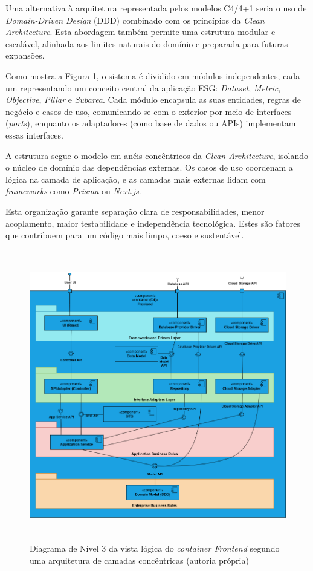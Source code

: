 Uma alternativa à arquitetura representada pelos modelos C4/4+1 seria o uso de \textit{Domain-Driven Design} (DDD) combinado com os princípios da \textit{Clean Architecture}. Esta abordagem também permite uma estrutura modular e escalável, alinhada aos limites naturais do domínio e preparada para futuras expansões.

Como mostra a Figura \ref{fig:alternativeModel}, o sistema é dividido em módulos independentes, cada um representando um conceito central da aplicação ESG: \textit{Dataset}, \textit{Metric}, \textit{Objective}, \textit{Pillar} e \textit{Subarea}. Cada módulo encapsula as suas entidades, regras de negócio e casos de uso, comunicando-se com o exterior por meio de interfaces (\textit{ports}), enquanto os adaptadores (como base de dados ou APIs) implementam essas interfaces.

A estrutura segue o modelo em anéis concêntricos da \textit{Clean Architecture}, isolando o núcleo de domínio das dependências externas. Os casos de uso coordenam a lógica na camada de aplicação, e as camadas mais externas lidam com \textit{frameworks} como \textit{Prisma} ou \textit{Next.js}.

Esta organização garante separação clara de responsabilidades, menor acoplamento, maior testabilidade e independência tecnológica. Estes são fatores que contribuem para um código mais limpo, coeso e sustentável.

\begin{figure}[H]
    \centering
    \includegraphics[height=5in,keepaspectratio]{frontmatter/assets/diagrams/AlternativeModel.drawio.png}
    \caption{Diagrama de Nível 3 da vista lógica do \textit{container Frontend} segundo uma arquitetura de camadas concêntricas (autoria própria)}
    \label{fig:alternativeModel}
\end{figure}